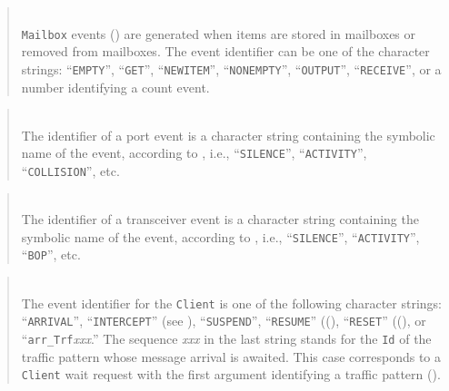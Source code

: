 \begin{quote}
\noindent{} \hspace{0in}\vspace{0.05in}\\
\noindent
{\tt Mailbox} events () are generated when items are stored
in mailboxes or removed from mailboxes.
The event identifier can be one of the character strings:
``{\tt EMPTY}'', ``{\tt GET}'',
``{\tt NEWITEM}'', ``{\tt NONEMPTY}'', ``{\tt OUTPUT}'', ``{\tt RECEIVE}'',
or a number identifying a count event.
\end{quote}

\begin{quote}
\noindent{} \hspace{0in}\vspace{0.05in}\\
\noindent
The identifier of a port event
is a character string containing the symbolic name of
the event, according to , i.e.,
``{\tt SILENCE}'', ``{\tt ACTIVITY}'', ``{\tt COLLISION}'', etc.
\end{quote}

\begin{quote}
\noindent{} \hspace{0in}\vspace{0.05in}\\
\noindent
The identifier of a transceiver event
is a character string containing the symbolic name of
the event, according to , i.e.,
``{\tt SILENCE}'', ``{\tt ACTIVITY}'', ``{\tt BOP}'', etc.
\end{quote}

\begin{quote}
\noindent{} \hspace{0in}\vspace{0.05in}\\
\noindent
The event identifier for the {\tt Client}
is one of the following character strings:
``{\tt ARRIVAL}'',
``{\tt INTERCEPT}'' (see ), 
``{\tt SUSPEND}'',
``{\tt RESUME}'' ((),
``{\tt RESET}'' ((),
or ``{\tt arr\_Trf}{\em xxx\/}.''
The sequence {\em xxx\/} in the last string stands for the {\tt Id} of
the traffic pattern whose message arrival is awaited.
This case corresponds to a {\tt Client} wait request with the first argument
identifying a traffic pattern ().
\end{quote}

